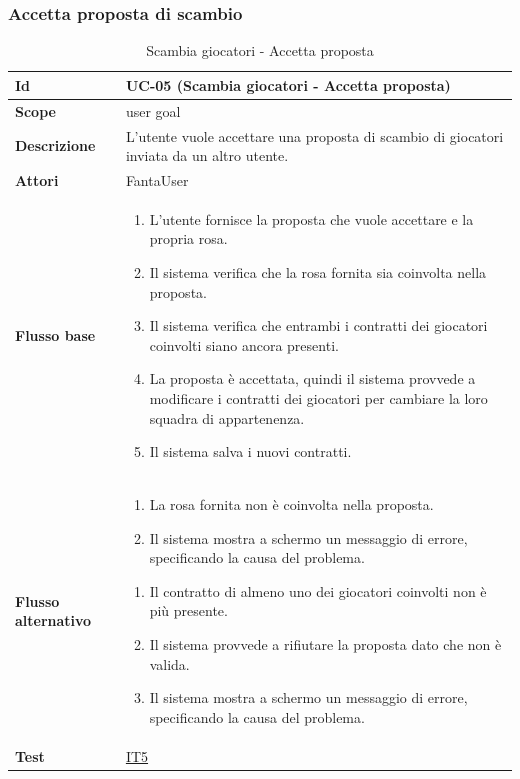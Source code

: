 \subsubsection{Accetta proposta di scambio}
\begin{table}[H]
\caption{Scambia giocatori - Accetta proposta}
\label{UC-05}

\begin{tabularx}{\textwidth}{|l|X|}
\hline
\textbf{Id} & UC-05 (Scambia giocatori - Accetta proposta) \\
\hline
\textbf{Scope} & user goal \\
\hline
\textbf{Descrizione} & L'utente vuole accettare una proposta di scambio di giocatori inviata da un altro utente. \\
\hline
\textbf{Attori} & FantaUser \\
\hline
\textbf{Flusso base} &
\begin{enumerate}[leftmargin=*]
    \item L'utente fornisce la proposta che vuole accettare e la propria rosa.
    \item Il sistema verifica che la rosa fornita sia coinvolta nella proposta.
    \item Il sistema verifica che entrambi i contratti dei giocatori coinvolti siano ancora presenti.
    \item La proposta è accettata, quindi il sistema provvede a modificare i contratti dei giocatori
            per cambiare la loro squadra di appartenenza.
    \item Il sistema salva i nuovi contratti. 
\end{enumerate} \\
\hline
\textbf{Flusso alternativo} &
\begin{enumerate}[leftmargin=*,label=2.\arabic*]
    \item La rosa fornita non è coinvolta nella proposta.
    \item Il sistema mostra a schermo un messaggio di errore, specificando la causa del problema.
\end{enumerate}
\begin{enumerate}[leftmargin=*,label=3.\arabic*]
    \item Il contratto di almeno uno dei giocatori coinvolti non è più presente.
    \item Il sistema provvede a rifiutare la proposta dato che non è valida.
    \item Il sistema mostra a schermo un messaggio di errore, specificando la causa del problema.
\end{enumerate} \\
\hline
\textbf{Test} & \hyperref[IT5]{IT5} \\
\hline
\end{tabularx}

\end{table}


